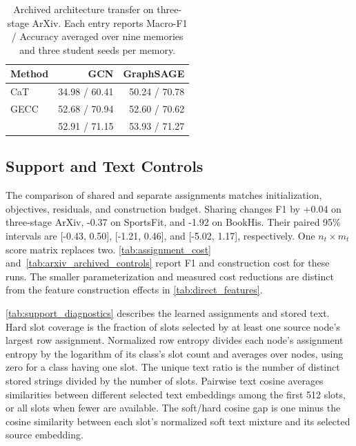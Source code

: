 \begin{table}[H]
\centering
\footnotesize
\caption{Archived architecture transfer on three-stage ArXiv. Each entry reports Macro-F1 / Accuracy averaged over nine memories and three student seeds per memory.}
\label{tab:sage}
\begin{tabular*}{\linewidth}{@{\extracolsep{\fill}}lrr@{}}
\toprule
Method & GCN & GraphSAGE\\
\midrule
CaT & 34.98 / 60.41 & 50.24 / 70.78\\
GECC & 52.68 / 70.94 & 52.60 / 70.62\\
\method{} & 52.91 / 71.15 & 53.93 / 71.27\\
\bottomrule
\end{tabular*}
\end{table}

\subsection{Support and Text Controls}

The comparison of shared and separate assignments matches initialization,
objectives, residuals, and construction budget. Sharing changes F1 by
+0.04 on three-stage ArXiv, -0.37 on SportsFit, and -1.92 on BookHis.
Their paired 95\% intervals are [-0.43, 0.50], [-1.21, 0.46], and
[-5.02, 1.17], respectively. One \(n_t\times m_t\) score matrix replaces two.
\autoref{tab:assignment_cost} and~\autoref{tab:arxiv_archived_controls}
report F1 and construction cost for these runs. The smaller parameterization
and measured cost reductions are distinct from the feature construction
effects in \autoref{tab:direct_features}.

\autoref{tab:support_diagnostics} describes the learned assignments and
stored text. Hard slot coverage is the fraction of slots selected by at
least one source node's largest row assignment. Normalized row entropy
divides each node's assignment entropy by the logarithm of its class's
slot count and averages over nodes, using zero for a class having one slot.
The unique text ratio is the number of distinct stored strings divided by
the number of slots.
Pairwise text cosine averages similarities between different selected text
embeddings among the first 512 slots, or all slots when fewer are available.
The soft/hard cosine gap is one minus the cosine similarity between each
slot's normalized soft text mixture and its selected source embedding.

